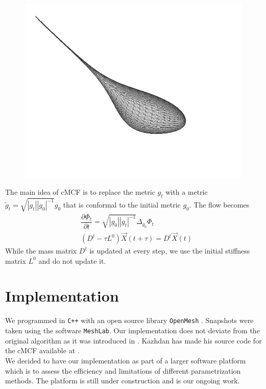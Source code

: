 \documentclass[11pt]{amsart}
\begin{document}
\begin{figure}[H]
\begin{center}
\begin{minipage}[!h]{0.28\textwidth}
\includegraphics[width=\textwidth]{spotMCF5}
\end{minipage}
\end{center}
\end{figure}

The main idea of cMCF is to replace the metric $g_t$ with a metric $\tilde{g}_t = \sqrt{|g_t||g_0|^{-1}}g_0$ that is conformal to the initial metric $g_0$. The flow becomes
\begin{align}
&\dfrac{\partial \Phi_t}{\partial t} = \sqrt{|g_0||g_t|^{-1}} \varDelta_{g_0} \Phi_t\\
 &(D^t - \tau L^0) \vec{X}(t+\tau) = D^t \vec{X}(t)
\end{align}
While the mass matrix $D^t$ is updated at every step, we use the initial stiffness matrix $L^0$ and do not update it. 

\section{Implementation}
We programmed in \texttt{C++} with an open source library \texttt{OpenMesh} \cite{om}. Snapshots were taken using the software \texttt{MeshLab}. Our implementation does not deviate from the original algorithm as it was introduced in \cite{ksbc}. Kazhdan has made his source code for the cMCF available at \cite{kazhdan}. \\
We decided to have our implementation as part of a larger software platform which is to assess the efficiency and limitations of different parametrization methods. The platform is still under construction and is our ongoing work.
\end{document}
